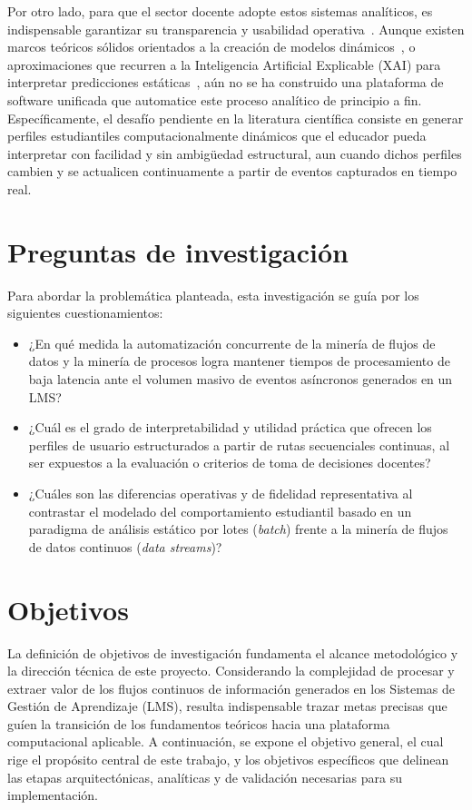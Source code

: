 Por otro lado, para que el sector docente adopte estos sistemas analíticos, es indispensable garantizar su transparencia y usabilidad operativa~\cite{BarredoArrieta2020}. Aunque existen marcos teóricos sólidos orientados a la creación de modelos dinámicos~\cite{YeseniaZavaleta-Sanchez2025}, o aproximaciones que recurren a la Inteligencia Artificial Explicable (XAI) para interpretar predicciones estáticas~\cite{Desai2025,Lee2025}, aún no se ha construido una plataforma de software unificada que automatice este proceso analítico de principio a fin. Específicamente, el desafío pendiente en la literatura científica consiste en generar perfiles estudiantiles computacionalmente dinámicos que el educador pueda interpretar con facilidad y sin ambigüedad estructural, aun cuando dichos perfiles cambien y se actualicen continuamente a partir de eventos capturados en tiempo real.

\section{Preguntas de investigación}
Para abordar la problemática planteada, esta investigación se guía por los siguientes cuestionamientos:

\begin{itemize}
    \item ¿En qué medida la automatización concurrente de la minería de flujos de datos y la minería de procesos logra mantener tiempos de procesamiento de baja latencia ante el volumen masivo de eventos asíncronos generados en un LMS?
    \item ¿Cuál es el grado de interpretabilidad y utilidad práctica que ofrecen los perfiles de usuario estructurados a partir de rutas secuenciales continuas, al ser expuestos a la evaluación o criterios de toma de decisiones docentes?
    \item ¿Cuáles son las diferencias operativas y de fidelidad representativa al contrastar el modelado del comportamiento estudiantil basado en un paradigma de análisis estático por lotes (\textit{batch}) frente a la minería de flujos de datos continuos (\textit{data streams})?
\end{itemize}

\section{Objetivos}
La definición de objetivos de investigación fundamenta el alcance metodológico y la dirección técnica de este proyecto. Considerando la complejidad de procesar y extraer valor de los flujos continuos de información generados en los Sistemas de Gestión de Aprendizaje (LMS), resulta indispensable trazar metas precisas que guíen la transición de los fundamentos teóricos hacia una plataforma computacional aplicable. A continuación, se expone el objetivo general, el cual rige el propósito central de este trabajo, y los objetivos específicos que delinean las etapas arquitectónicas, analíticas y de validación necesarias para su implementación.


